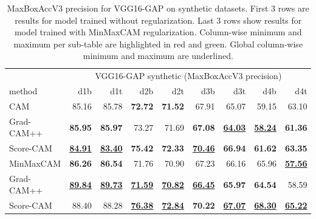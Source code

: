 \begin{table}[h]
\centering
\begin{tabular}{lrrrrrrrr}
\toprule
 & \multicolumn{8}{c}{VGG16-GAP synthetic (MaxBoxAccV3 precision)} \\
method & d1b & d1t & d2b & d2t & d3b & d3t & d4b & d4t \\
\cmidrule(lr){1-1} \cmidrule(lr){2-9} 
CAM & 85.16 & 85.78 & \color{purple} \bfseries 72.72 & \color{purple} \bfseries 71.52 & 67.91 & 65.07 & 59.15 & 63.10 \\
Grad-CAM++ & \color{teal} \bfseries 85.95 & \color{teal} \bfseries 85.97 & 73.27 & 71.69 & \color{purple} \bfseries 67.08 & \color{purple} \bfseries \underline{64.03} & \color{purple} \bfseries \underline{58.24} & \color{purple} \bfseries 61.36 \\
Score-CAM & \color{purple} \bfseries \underline{84.91} & \color{purple} \bfseries \underline{83.40} & \color{teal} \bfseries 75.42 & \color{teal} \bfseries 72.33 & \color{teal} \bfseries \underline{70.46} & \color{teal} \bfseries 66.94 & \color{teal} \bfseries 61.62 & \color{teal} \bfseries 63.35 \\
\cmidrule(lr){1-1} \cmidrule(lr){2-9} 
MinMaxCAM & \color{purple} \bfseries 86.26 & \color{purple} \bfseries 86.54 & 71.76 & 70.90 & 67.23 & 66.16 & 65.96 & \color{purple} \bfseries \underline{57.56} \\
Grad-CAM++ & \color{teal} \bfseries \underline{89.84} & \color{teal} \bfseries \underline{89.73} & \color{purple} \bfseries \underline{71.59} & \color{purple} \bfseries \underline{70.82} & \color{purple} \bfseries \underline{66.45} & \color{purple} \bfseries 65.97 & \color{purple} \bfseries 64.54 & 58.59 \\
Score-CAM & 88.40 & 88.28 & \color{teal} \bfseries \underline{76.38} & \color{teal} \bfseries \underline{72.84} & \color{teal} \bfseries 70.22 & \color{teal} \bfseries \underline{67.07} & \color{teal} \bfseries \underline{68.30} & \color{teal} \bfseries \underline{65.22} \\
\bottomrule
\end{tabular}
\caption[MaxBoxAccV3 for VGG16-GAP on synthetic datasets]{MaxBoxAccV3 precision for VGG16-GAP on synthetic datasets. First 3 rows are results for model trained without regularization. Last 3 rows show results for model trained with MinMaxCAM regularization. Column-wise minimum and maximum per sub-table are highlighted in red and green. Global column-wise minimum and maximum are underlined.}
\label{tab:maxboxaccv3_precision_vgg16_gap_synthetic}
\end{table}

